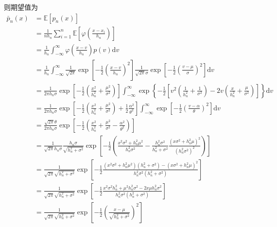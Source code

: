 \documentclass[openany]{ctexbook}
\theoremstyle{kaiti}
\theoremstyle{normal}
\begin{document}
则期望值为
\begin{equation}
  \begin{aligned}
    \bar{p}_{n}(x)
    &=\mathbb{E}[p_n(x)]\\
    &=\frac{1}{nh_n}\sum_{i=1}^n\mathbb{E}\left[\varphi\left(\frac{x-x_{i}}{h_{n}}\right)\right]\\
    &=\frac{1}{h_n}\int_{-\infty}^\infty\varphi\left(\frac{x-v}{h_{n}}\right)p(v)\mathrm{d}v\\
    &=\frac{1}{h_n}\int_{-\infty}^\infty\frac{1}{\sqrt{2\pi}}\exp\left[-\frac{1}{2}\left(\frac{x-v}{h_n}\right)^2\right]\frac{1}{\sqrt{2\pi}\sigma}\exp\left[-\frac{1}{2}\left(\frac{v-\mu}{\sigma}\right)^2\right]\mathrm{d}v\\
    &=\frac{1}{2\pi h_n\sigma}\exp\left[-\frac{1}{2}\left(\frac{x^2}{h_n^2}+\frac{\mu^2}{\sigma^2}\right)\right]\int_{-\infty}^\infty\exp\left\{-\frac{1}{2}\left[v^2\left(\frac{1}{h_n^2}+\frac{1}{\sigma^2}\right)-2v\left(\frac{x}{h_n^2}+\frac{\mu}{\sigma^2}\right)\right]\right\}\mathrm{d}v\\
    &=\frac{1}{2\pi h_n\sigma}\exp\left[-\frac{1}{2}\left(\frac{x^2}{h_n^2}+\frac{\mu^2}{\sigma^2}\right)+\frac{1}{2}\frac{\alpha^2}{\theta^2}\right]\int_{-\infty}^\infty\exp\left[-\frac{1}{2}\left(\frac{v-\alpha}{\theta}\right)^2\right]\mathrm{d}v\\
    &=\frac{\sqrt{2\pi}\theta}{2\pi h_n\sigma}\exp\left[-\frac{1}{2}\left(\frac{x^2}{h_n^2}+\frac{\mu^2}{\sigma^2}-\frac{\alpha^2}{\theta^2}\right)\right]\\
    &=\frac{1}{\sqrt{2\pi}h_n\sigma}\frac{h_n\sigma}{\sqrt{h_n^2+\sigma^2}}\exp\left[-\frac{1}{2}\left(\frac{x^2\sigma^2+h_n^2\mu^2}{h_n^2\sigma^2}-\frac{h_n^2\sigma^2}{h_n^2+\sigma^2}\frac{(x\sigma^2+h_n^2\mu)^2}{(h_n^2\sigma^2)^2}\right)\right]\\
    &=\frac{1}{\sqrt{2\pi}\sqrt{h_n^2+\sigma^2}}\exp\left[-\frac{1}{2}\frac{(x^2\sigma^2+h_n^2\mu^2)(h_n^2+\sigma^2)-(x\sigma^2+h_n^2\mu)^2}{h_n^2\sigma^2(h_n^2+\sigma^2)}\right]\\
    &=\frac{1}{\sqrt{2\pi}\sqrt{h_n^2+\sigma^2}}\exp\left[-\frac{1}{2}\frac{x^2\sigma^2h_n^2+\mu^2h_n^2\sigma^2-2x\mu h_n^2\sigma^2}{h_n^2\sigma^2(h_n^2+\sigma^2)}\right]\\
    &=\frac{1}{\sqrt{2\pi}\sqrt{h_n^2+\sigma^2}}\exp\left[-\frac{1}{2}\left(\frac{x-\mu}{\sqrt{h_n^2+\sigma^2}}\right)^2\right]\\
  \end{aligned}
\end{equation}
\end{document}
